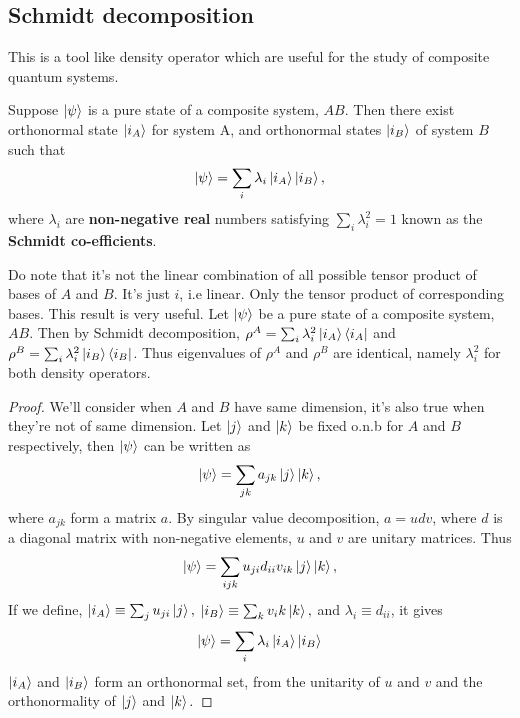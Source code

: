 \subsection{Schmidt decomposition}
This is a tool like density operator which are useful for the study of composite quantum systems.
\begin{theorem}
    Suppose $\ket{\psi}$ is a pure state of a composite system, $AB$. Then there exist orthonormal state $\ket{i_A}$ for system A, and orthonormal states $\ket{i_B}$ of system $B$ such that
    \begin{equation}
        \ket{\psi} = \sum_i \lambda_i \ket{i_A}\ket{i_B},
    \end{equation}
    where $\lambda_i$ are \textbf{non-negative real} numbers satisfying $\sum_i \lambda_i^2 = 1$ known as the \textbf{Schmidt co-efficients}.
\end{theorem}
Do note that it's not the linear combination of all possible tensor product of bases of $A$ and $B$. It's just $i$, i.e linear. Only the tensor product of corresponding bases. This result is very useful. Let $\ket{\psi}$ be a pure state of a composite system, $AB$. Then by Schmidt decomposition, $\rho^A = \sum_i \lambda_i^2 \ket{i_A}\bra{i_A}$ and $\rho^B = \sum_i \lambda_i^2 \ket{i_B}\bra{i_B}$. Thus eigenvalues of $\rho^A$ and $\rho^B$ are identical, namely $\lambda_i^2$ for both density operators.

\begin{proof}
    We'll consider when $A$ and $B$ have same dimension, it's also true when they're not of same dimension. Let $\ket{j}$ and $\ket{k}$ be fixed o.n.b for $A$ and $B$ respectively, then $\ket{\psi}$ can be written as
    \begin{equation}
        \ket{\psi} = \sum_{jk} a_{jk}\ket{j}\ket{k},
    \end{equation}
    where $a_{jk}$ form a matrix $a$. By singular value decomposition, $a = udv$, where $d$ is a diagonal matrix with non-negative elements, $u$ and $v$ are unitary matrices. Thus
    \begin{equation}
        \ket{\psi} = \sum_{ijk} u_{ji}d_{ii}v_{ik}  \ket{j}\ket{k},
    \end{equation}
    If we define, $\ket{i_A} \equiv \sum_j u_{ji}\ket{j},$ $\ket{i_B} \equiv \sum_k v_ik \ket{k},$ and $\lambda_i \equiv d_{ii}$, it gives
    \begin{equation}
        \ket{\psi} = \sum_i \lambda_i \ket{i_A}\ket{i_B}
    \end{equation}
    $\ket{i_A}$ and $\ket{i_B}$ form an orthonormal set, from the unitarity of $u$ and $v$ and the orthonormality of $\ket{j}$ and $\ket{k}.$
\end{proof}

